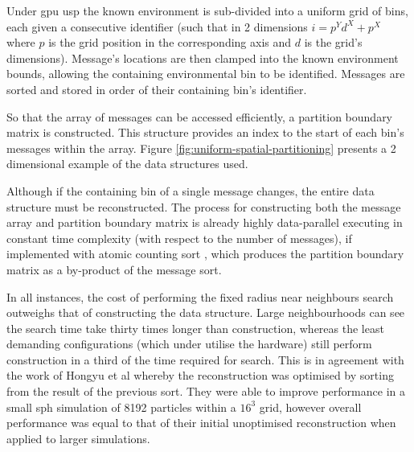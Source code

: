 Under \gls{gpu} \gls{usp} the known environment is sub-divided into a uniform grid of bins, each given a consecutive identifier (such that in 2 dimensions $i = p^{Y}d^{X}+p^{X}$ where $p$ is the grid position in the corresponding axis and $d$ is the grid's dimensions). Message's locations are then clamped into the known environment bounds, allowing the containing environmental bin to be identified. Messages are sorted and stored in order of their containing bin's identifier.

So that the array of messages can be accessed efficiently, a partition boundary matrix is constructed. This structure provides an index to the start of each bin's messages within the array. Figure \ref{fig:uniform-spatial-partitioning} presents a 2 dimensional example of the data structures used.

Although if the containing bin of a single message changes, the entire data structure must be reconstructed. The process for constructing both the message array and partition boundary matrix is already highly data-parallel executing in constant time complexity (with respect to the number of messages), if implemented with atomic counting sort \cite{SK*10,LOS10}, which produces the partition boundary matrix as a by-product of the message sort.

In all instances, the cost of performing the fixed radius near neighbours search outweighs that of constructing the data structure. Large neighbourhoods can see the search time take thirty times longer than construction, whereas the least demanding configurations (which under utilise the hardware) still perform construction in a third of the time required for search. This is in agreement with the work of Hongyu et al whereby the reconstruction was optimised by sorting from the result of the previous sort\cite{HY*15}. They were able to improve performance in a small \gls{sph} simulation of 8192 particles within a $16^{3}$ grid, however overall performance was equal to that of their initial unoptimised reconstruction when applied to larger simulations.

